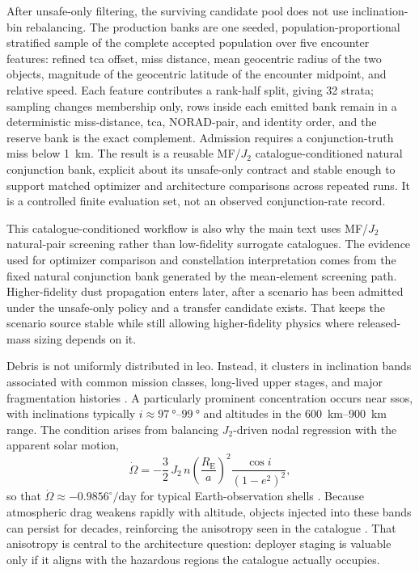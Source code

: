    After unsafe-only filtering, the surviving candidate pool does not use inclination-bin rebalancing. The production banks are one seeded, population-proportional stratified sample of the complete accepted population over five encounter features: refined \gls{tca} offset, miss distance, mean geocentric radius of the two objects, magnitude of the geocentric latitude of the encounter midpoint, and relative speed. Each feature contributes a rank-half split, giving \num{32} strata; sampling changes membership only, rows inside each emitted bank remain in a deterministic miss-distance, \gls{tca}, NORAD-pair, and identity order, and the reserve bank is the exact complement. Admission requires a conjunction-truth miss below \SI{1}{\kilo\metre}. The result is a reusable MF/\(J_2\) catalogue-conditioned natural conjunction bank, explicit about its unsafe-only contract and stable enough to support matched optimizer and architecture comparisons across repeated runs. It is a controlled finite evaluation set, not an observed conjunction-rate record.

    This catalogue-conditioned workflow is also why the main text uses MF/\(J_2\) natural-pair screening rather than low-fidelity surrogate catalogues. The evidence used for optimizer comparison and constellation interpretation comes from the fixed natural conjunction bank generated by the mean-element screening path. Higher-fidelity dust propagation enters later, after a scenario has been admitted under the unsafe-only policy and a transfer candidate exists. That keeps the scenario source stable while still allowing higher-fidelity physics where released-mass sizing depends on it.

    Debris is not uniformly distributed in \gls{leo}. Instead, it clusters in inclination bands associated with common mission classes, long-lived upper stages, and major fragmentation histories \cite{Johnson2001,Kessler1978}. A particularly prominent concentration occurs near \glspl{sso}, with inclinations typically \(i \approx \SIrange{97}{99}{\degree}\) and altitudes in the \SIrange{600}{900}{\km} range. The  condition arises from balancing \(J_2\)-driven nodal regression with the apparent solar motion,
    \begin{equation}
        \dot{\Omega}
        = -\frac{3}{2}\,J_2\,n\left(\frac{R_{\mathrm{E}}}{a}\right)^2\frac{\cos i}{(1-e^2)^2},
    \end{equation}
    so that \(\dot{\Omega}\approx -0.9856^\circ/\mathrm{day}\) for typical Earth-observation shells \cite{vallado2013}. Because atmospheric drag weakens rapidly with altitude, objects injected into these bands can persist for decades, reinforcing the anisotropy seen in the catalogue \cite{Krisko2014ORDEM}. That anisotropy is central to the architecture question: deployer staging is valuable only if it aligns with the hazardous regions the catalogue actually occupies.

